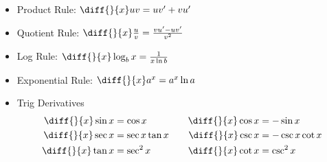 \documentclass{article}
\begin{document}
\begin{itemize}
\begin{itemize}
        \item Product Rule: $\diff{}{x} uv = uv' + vu'$
        \item Quotient Rule: $\diff{}{x} \frac{u}{v} = \frac{vu' - uv'}{v^2}$
        \item Log Rule: $\diff{}{x} \log_bx = \frac{1}{x\ln b}$
        \item Exponential Rule: $\diff{}{x} a^x = a^x\ln a$
        \item Trig Derivatives
        \begin{equation*}
            \begin{aligned}[c]
            \diff{}{x} \sin x &= \cos x \\
            \diff{}{x} \sec x &= \sec x \tan x \\
            \diff{}{x} \tan x &= \sec^2 x
            \end{aligned}
            \qquad
            \begin{aligned}[c]
            \diff{}{x} \cos x &= -\sin x \\
            \diff{}{x} \csc x &= -\csc x \cot x \\
            \diff{}{x} \cot x &= \csc^2 x
            \end{aligned}
        \end{equation*}
    \end{itemize}
\end{itemize}

\newpage
\end{document}
